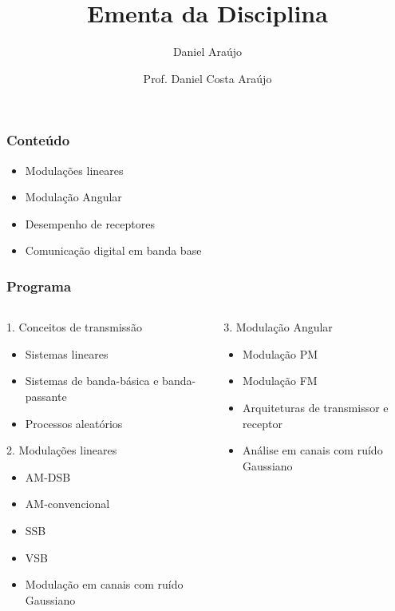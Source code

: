 \documentclass[10pt,hyperref={pdfpagemode=FullScreen},aspectratio=169]{beamer}
\title{\doctitle}
\author{Daniel Araújo}
\institute{\universidade}
\title{Ementa da Disciplina}
\author{Prof. Daniel Costa Araújo}
\begin{document}
\frame{\titlepage}


\begin{frame}
  \frametitle{Conteúdo}

  \begin{itemize}
    \item Modulações lineares
    \item Modulação Angular
    \item Desempenho de receptores
    \item Comunicação digital em banda base
  \end{itemize}

\end{frame}

\begin{frame}
  \frametitle{Programa}
\begin{columns}[T]
  \begin{column}{0.5\textwidth}
    \begin{block}{1. Conceitos de transmissão}
      \begin{itemize}
        \item Sistemas lineares
        \item Sistemas de banda-básica e banda-passante
        \item Processos aleatórios
      \end{itemize}
    \end{block}
  
    \begin{block}{2. Modulações lineares}
      \begin{itemize}
        \item AM-DSB
        \item AM-convencional
        \item SSB
        \item VSB
        \item Modulação em canais com ruído Gaussiano
      \end{itemize}
    \end{block}
  \end{column}

  \begin{column}{0.5\textwidth}
    \begin{block}{3. Modulação Angular}
      
       \begin{itemize}
        \item Modulação PM
        \item Modulação FM
        \item Arquiteturas de transmissor e receptor
        \item Análise em canais com ruído Gaussiano
       \end{itemize}
  

\end{block}
\end{column}
\end{columns}
\end{frame}
\end{document}
